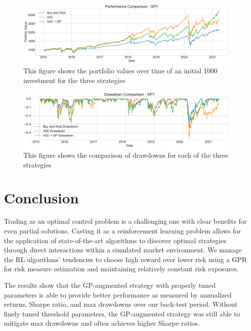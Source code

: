 \documentclass[12pt]{article}
\begin{document}
\begin{figure}[t]
	\centering
	\includegraphics[width=\linewidth]{../src/figures/rl_gp_comparison_no_restrictions.pdf}
	\caption{This figure shows the portfolio values over time of an initial 1000 investment for the three strategies}
	\label{fig:spy perf comp}
\end{figure}

\begin{figure}[t]
	\centering
	\includegraphics[width=\linewidth]{../src/figures/spy_drawdowns_comparison.pdf}
	\caption{This figure shows the comparison of drawdowns for each of the three strategies}
	\label{fig:spy dd comp}
\end{figure}

\section{Conclusion} \label{conclusion}

Trading as an optimal control problem is a challenging one with clear benefits for even partial solutions. Casting it as a reinforcement learning problem allows for the application of state-of-the-art algorithms to discover optimal strategies through direct interactions within a simulated market environment. We manage the RL algorithms' tendencies to choose high reward over lower risk using a GPR for risk measure estimation and maintaining relatively constant risk exposures.

The results show that the GP-augmented strategy with properly tuned parameters is able to provide better performance as measured by annualized returns, Sharpe ratio, and max drawdowns over our back-test period. Without finely tuned threshold parameters, the GP-augmented strategy was still able to mitigate max drawdowns and often achieves higher Sharpe ratios. 
\end{document}
